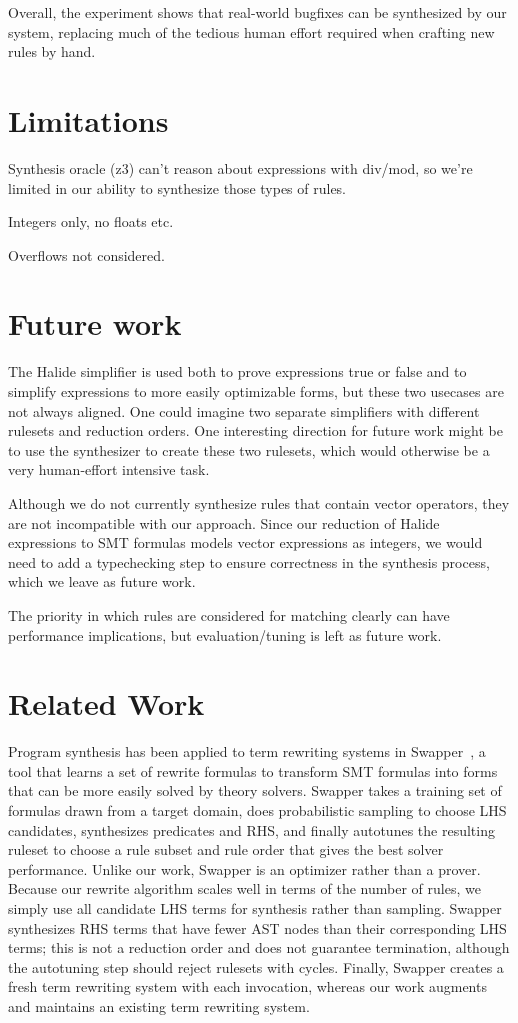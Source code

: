 \documentclass[sigplan,10pt,review,anonymous]{acmart}\settopmatter{printfolios=true,printccs=false,printacmref=false}
\begin{document}
Overall, the experiment shows that real-world bugfixes can be synthesized by
our system, replacing much of the tedious human effort required when crafting
new rules by hand.

\section{Limitations}
Synthesis oracle (z3) can't reason about expressions with div/mod, so we're limited in our ability to synthesize those types of rules.

Integers only, no floats etc.

Overflows not considered.

\section{Future work}
The Halide simplifier is used both to prove expressions true or false and to simplify expressions to more easily optimizable forms, but these two usecases are not always aligned. One could imagine two separate simplifiers with different rulesets and reduction orders. One interesting direction for future work might be to use the synthesizer to create these two rulesets, which would otherwise be a very human-effort intensive task.

Although we do not currently synthesize rules that contain vector operators, they are not incompatible with our approach. Since our reduction of Halide expressions to SMT formulas models vector expressions as integers, we would need to add a typechecking step to ensure correctness in the synthesis process, which we leave as future work.

The priority in which rules are considered for matching clearly can have performance implications, but evaluation/tuning is left as future work.

\section{Related Work}

Program synthesis has been applied to term rewriting systems in Swapper~\cite{singh2016swapper}, a tool that learns a set of rewrite formulas to transform SMT formulas into forms that can be more easily solved by theory solvers. Swapper takes a training set of formulas drawn from a target domain, does probabilistic sampling to choose LHS candidates, synthesizes predicates and RHS, and finally autotunes the resulting ruleset to choose a rule subset and rule order that gives the best solver performance. Unlike our work, Swapper is an optimizer rather than a prover. Because our rewrite algorithm scales well in terms of the number of rules, we simply use all candidate LHS terms for synthesis rather than sampling. Swapper synthesizes RHS terms that have fewer AST nodes than their corresponding LHS terms; this is not a reduction order and does not guarantee termination, although the autotuning step should reject rulesets with cycles. Finally, Swapper creates a fresh term rewriting system with each invocation, whereas our work augments and maintains an existing term rewriting system.
\end{document}
